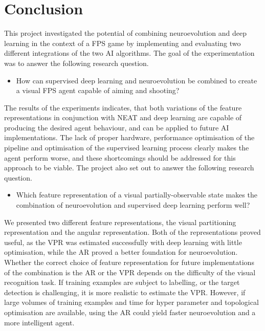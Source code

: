 \section{Conclusion}
\label{sec:conclusion}
This project investigated the potential of combining neuroevolution and deep learning in the context of a FPS game by implementing and evaluating two different integrations of the two AI algorithms. The goal of the experimentation was to answer the following research question.
\begin{itemize}
\item How can supervised deep learning and neuroevolution be combined to create a visual FPS agent capable of aiming and shooting?
\end{itemize}
The results of the experiments indicates, that both variations of the feature representations in conjunction with NEAT and deep learning are capable of producing the desired agent behaviour, and can be applied to future AI implementations. The lack of proper hardware, performance optimisation of the pipeline and optimisation of the supervised learning process clearly makes the agent perform worse, and these shortcomings should be addressed for this approach to be viable. The project also set out to answer the following research question.
\begin{itemize}
\item Which feature representation of a visual partially-observable state makes the combination of neuroevolution and supervised deep learning perform well?
\end{itemize}
We presented two different feature representations, the visual partitioning representation and the angular representation. Both of the representations proved useful, as the VPR was estimated successfully with deep learning with little optimisation, while the AR proved a better foundation for neuroevolution. Whether the correct choice of feature representation for future implementations of the combination is the AR or the VPR depends on the difficulty of the visual recognition task. If training examples are subject to labelling, or the target detection is challenging, it is more realistic to estimate the VPR. However, if large volumes of training examples and time for hyper parameter and topological optimisation are available, using the AR could yield faster neuroevolution and a more intelligent agent.
